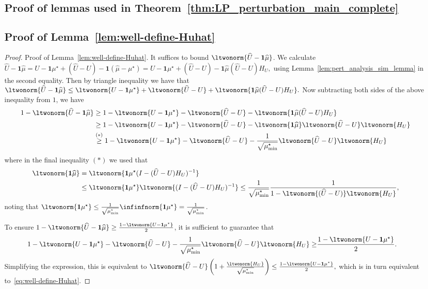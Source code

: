 \documentclass[mnsc,nonblindrev]{informs3}
\newcommand{\one}{\mathbf{1}}
\newcommand{\muhat}{\widehat{\mu}}
\newcommand{\uhat}{\widehat{U}}
\begin{document}
\begin{APPENDICES}
\section{Proof of lemmas used in Theorem~\ref{thm:LP_perturbation_main_complete}}\label{sec:proof-PA}
\subsection{Proof of Lemma~\ref{lem:well-define-Huhat}}\label{sec:pr-well-define-Huhat}
\begin{proof}{Proof of Lemma~\ref{lem:well-define-Huhat}.}
    It suffices to bound $\ltwonorm{\uhat-\one\muhat}$.
    We calculate
    $
        \uhat - \one \muhat 
        = U - \one \mu^\star + (\uhat-U) - \one (\muhat - \mu^\star) 
        = U - \one \mu^\star + (\uhat-U) - \one \muhat (\uhat-U)H_{U},
    $
    using Lemma~\ref{lem:pert_analysis_sim_lemma} in the second equality.
    Then by triangle inequality we have that
    $
        \ltwonorm{\uhat - \one \muhat} 
        \leq \ltwonorm{ U - \one \mu^\star} + \ltwonorm{\uhat-U} + \ltwonorm{\one \muhat (\uhat-U)H_{U}}.
    $
    Now subtracting both sides of the above inequality from $1$, we have
    \begin{align*}
        1 - \ltwonorm{\uhat - \one \muhat} 
        &\geq 1 - \ltwonorm{ U - \one \mu^\star}-\ltwonorm{\uhat-U}-\ltwonorm{\one \muhat (\uhat-U)H_{U}} \\
        & \geq 1 - \ltwonorm{ U - \one \mu^\star}-\ltwonorm{\uhat-U}
        -\ltwonorm{\one \muhat} \ltwonorm{\uhat-U} \ltwonorm{H_{U}} \\
        & \stackrel{(*)}{\geq} 1 - \ltwonorm{ U - \one \mu^\star}-\ltwonorm{\uhat-U} 
         -\frac{1}{\sqrt{\mu^\star_{\min}}}\ltwonorm{\uhat-U} \ltwonorm{H_{U}}
    \end{align*}
    where in the final inequality $(*)$ we used that
    \begin{align*}
        \ltwonorm{\one \muhat} &= \ltwonorm{\one \mu^\star (I - (\uhat-U)H_U)^{-1}} \\
        &\leq \ltwonorm{\one \mu^\star } \ltwonorm{ (I - (\uhat-U)H_U)^{-1}}
        \leq \frac{1}{\sqrt{\mu^\star_{\min}}} \frac{1}{1- \ltwonorm{(\uhat-U)} \ltwonorm{H_U} },
    \end{align*}
    noting that $\ltwonorm{\one \mu^\star } \leq \frac{1}{\sqrt{\mu^\star_{\min}}} \infinfnorm{\one \mu^\star} = \frac{1}{\sqrt{\mu^\star_{\min}}}$.
    
    To ensure $1-\ltwonorm{\uhat - \one \muhat} \geq \frac{1-\ltwonorm{U - \one \mu^\star}}{2}$, it is sufficient to guarantee that
    \begin{align*}
        1 - \ltwonorm{ U - \one \mu^\star} -\ltwonorm{\uhat-U} 
         -\frac{1}{\sqrt{\mu^\star_{\min}}}\ltwonorm{\uhat-U} \ltwonorm{H_{U}} 
        \geq& \frac{1-\ltwonorm{U - \one \mu^\star}}{2}.
    \end{align*}
    Simplifying the expression, this is equivalent to
    $
        \ltwonorm{\uhat-U}\left(1 + \frac{\ltwonorm{H_{U}}}{\sqrt{\mu^\star_{\min}}} \right) \leq \frac{1-\ltwonorm{U - \one \mu^\star}}{2},
    $
    which is in turn equivalent to~\eqref{eq:well-define-Huhat}.
\end{proof}


\end{APPENDICES}
\end{document}
